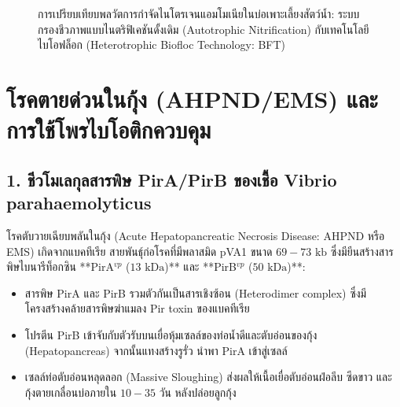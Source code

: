 \begin{figure}[ht]
\caption{การเปรียบเทียบพลวัตการกำจัดไนโตรเจนแอมโมเนียในบ่อเพาะเลี้ยงสัตว์น้ำ: ระบบกรองชีวภาพแบบไนตริฟิเคชันดั้งเดิม (Autotrophic Nitrification) กับเทคโนโลยีไบโอฟล็อก (Heterotrophic Biofloc Technology: BFT)}
\label{fig:aquaculture_nitrogen_pathways}
\end{figure}

\section{โรคตายด่วนในกุ้ง (AHPND/EMS) และการใช้โพรไบโอติกควบคุม}

\subsection{1. ชีวโมเลกุลสารพิษ PirA/PirB ของเชื้อ Vibrio parahaemolyticus}
โรคตับวายเฉียบพลันในกุ้ง (Acute Hepatopancreatic Necrosis Disease: AHPND หรือ EMS) เกิดจากแบคทีเรีย  สายพันธุ์ก่อโรคที่มีพลาสมิด pVA1 ขนาด $69 - 73\text{ kb}$ ซึ่งมียีนสร้างสารพิษไบนารีท็อกซิน **PirA$^{vp}$ ($13\text{ kDa}$)** และ **PirB$^{vp}$ ($50\text{ kDa}$)**:
\begin{itemize}
    \item สารพิษ PirA และ PirB รวมตัวกันเป็นสารเชิงซ้อน (Heterodimer complex) ซึ่งมีโครงสร้างคล้ายสารพิษฆ่าแมลง Pir toxin ของแบคทีเรีย 
    \item โปรตีน PirB เข้าจับกับตัวรับบนเยื่อหุ้มเซลล์ของท่อน้ำดีและตับอ่อนของกุ้ง (Hepatopancreas) จากนั้นแทงสร้างรูรั่ว นำพา PirA เข้าสู่เซลล์
    \item เซลล์ท่อตับอ่อนหลุดลอก (Massive Sloughing) ส่งผลให้เนื้อเยื่อตับอ่อนฝ่อลีบ ซีดขาว และกุ้งตายเกลื่อนบ่อภายใน $10 - 35\text{ วัน}$ หลังปล่อยลูกกุ้ง
\end{itemize}

